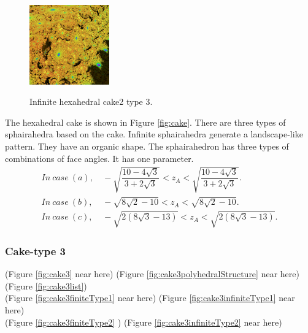 \documentclass[suppldata, dvipdfmx]{interact}
\theoremstyle{plain}%
\theoremstyle{definition}
\theoremstyle{remark}
\theoremstyle{problemstyle}
\begin{document}
\begin{figure}[H]
\begin{minipage}{0.5\textwidth}
\begin{minipage}[t]{0.24\textwidth}
  \end{minipage}
  \hspace*{\fill}
  \begin{minipage}[t]{0.24\textwidth}
   \centering
   \includegraphics[width=1.35in, height=1.35in,
   keepaspectratio]{./img/sphairahedron/hexahedralCake2/limitsetInf_c.jpg} 
   \label{fig:cake2type3infiniteLimitset}
  \end{minipage}
  \hspace*{\fill}
  \caption{Infinite hexahedral cake2 type 3.}
  \label{fig:cake2Type3infinite}
 \end{minipage}
\end{figure}

The hexahedral cake is shown in Figure \ref{fig:cake}. There are three
types of sphairahedra based on the cake.
Infinite sphairahedra generate a landscape-like pattern.
They have an organic shape.
The sphairahedron has three types of combinations of face angles.
It has one parameter.
\begin{align*}
 In~case~(a),&~- \sqrt{\dfrac{10 - 4 \sqrt{3}}{3 + 2 \sqrt{3}}} < z_A <\sqrt{\dfrac{10 - 4 \sqrt{3}}{3 + 2 \sqrt{3}}}.\\ 
 In~case~(b),&~-\sqrt{8\sqrt{2}-10} < z_A < \sqrt{8\sqrt{2} - 10}.\\
 In~case~(c),&~-\sqrt{2(8\sqrt{3} - 13)} < z_A < \sqrt{2(8\sqrt{3} - 13)}.
\end{align*}

\subsubsection{Cake-type 3}

\noindent(Figure \ref{fig:cake3} near here)
(Figure \ref{fig:cake3polyhedralStructure} near here)\\
(Figure \ref{fig:cake3list})\\
(Figure \ref{fig:cake3finiteType1}
 near here)
(Figure \ref{fig:cake3infiniteType1}
 near here)\\
(Figure \ref{fig:cake3finiteType2}
)
(Figure \ref{fig:cake3infiniteType2}
 near here)
\end{document}

